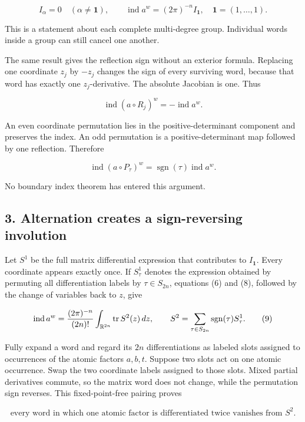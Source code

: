 \documentclass[
  11pt,
]{article}
\begin{document}
\[
 I_\alpha=0\quad(\alpha\ne\mathbf1),
 \qquad
 \operatorname{ind}a^w=(2\pi)^{-n}I_{\mathbf1},
 \quad \mathbf1=(1,\ldots,1).
 \tag{6}
\]

This is a statement about each complete multi-degree group. Individual
words inside a group can still cancel one another.

The same result gives the reflection sign without an exterior formula.
Replacing one coordinate \(z_j\) by \(-z_j\) changes the sign of every
surviving word, because that word has exactly one \(z_j\)-derivative.
The absolute Jacobian is one. Thus

\[
 \operatorname{ind}(a\circ R_j)^w=-\operatorname{ind}a^w.
 \tag{7}
\]

An even coordinate permutation lies in the positive-determinant
component and preserves the index. An odd permutation is a
positive-determinant map followed by one reflection. Therefore

\[
 \operatorname{ind}(a\circ P_\tau)^w
   =\operatorname{sgn}(\tau)\operatorname{ind}a^w.
 \tag{8}
\]

No boundary index theorem has entered this argument.

\subsection{3. Alternation creates a sign-reversing
involution}\label{alternation-creates-a-sign-reversing-involution}

Let \(S^1\) be the full matrix differential expression that contributes
to \(I_{\mathbf1}\). Every coordinate appears exactly once. If
\(S^1_\tau\) denotes the expression obtained by permuting all
differentiation labels by \(\tau\in S_{2n}\), equations (6) and (8),
followed by the change of variables back to \(z\), give

\[
 \operatorname{ind}a^w
  ={(2\pi)^{-n}\over(2n)!}
   \int_{\mathbb R^{2n}}\operatorname{tr}S^2(z)\,dz,
 \qquad
 S^2=\sum_{\tau\in S_{2n}}
        \operatorname{sgn}(\tau)S^1_\tau.
 \tag{9}
\]

Fully expand a word and regard its \(2n\) differentiations as labeled
slots assigned to occurrences of the atomic factors \(a,b,t\). Suppose
two slots act on one atomic occurrence. Swap the two coordinate labels
assigned to those slots. Mixed partial derivatives commute, so the
matrix word does not change, while the permutation sign reverses. This
fixed-point-free pairing proves

\[
 \text{every word in which one atomic factor is differentiated twice
 vanishes from }S^2.
 \tag{10}
\]
\end{document}

